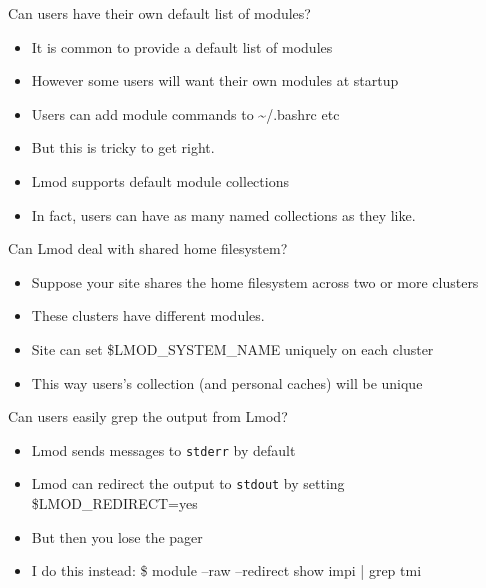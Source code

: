 \documentclass{beamer}
\begin{document}
\begin{frame}{Can users have their own default list of modules?}
  \begin{itemize}
    \item It is common to provide a default list of modules
    \item However some users will want their own modules at startup
    \item Users can add module commands to \textasciitilde/.bashrc etc
    \item But this is tricky to get right.
    \item Lmod supports default module collections
    \item In fact, users can have as many named collections as they like.
  \end{itemize}
\end{frame}


\begin{frame}{Can Lmod deal with shared home filesystem?}
  \begin{itemize}
    \item Suppose your site shares the home filesystem across two or
      more clusters
    \item These clusters have different modules.
    \item Site can set \$LMOD\_SYSTEM\_NAME uniquely on each cluster
    \item This way users's collection (and personal caches) will be
      unique
  \end{itemize}
\end{frame}

\begin{frame}{Can users easily grep the output from Lmod?}
  \begin{itemize}
    \item Lmod sends messages to \texttt{stderr} by default
    \item Lmod can redirect the output to \texttt{stdout} by setting \$LMOD\_REDIRECT=yes
    \item But then you lose the pager
    \item I do this instead: \$ module --raw --redirect show impi |
      grep tmi
  \end{itemize}
\end{frame}
\end{document}
